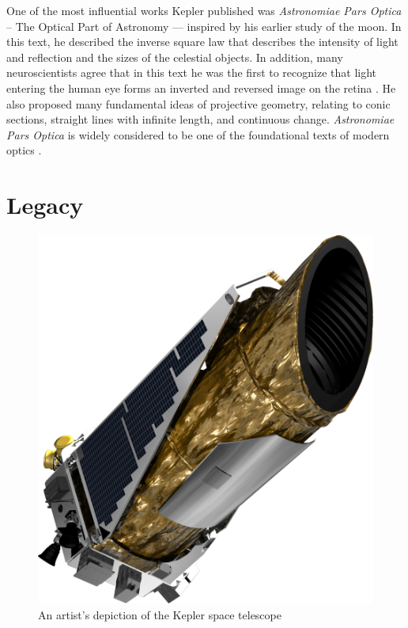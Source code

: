 \documentclass[11pt]{article}
\begin{document}
One of the most influential works
Kepler published was \textit{Astronomiae Pars Optica}
-- The Optical Part of Astronomy ---
inspired by his earlier study of the moon.
In this text,
he described the inverse square law
that describes the intensity of light and reflection
and the sizes of the celestial objects.
In addition,
many neuroscientists agree that
in this text
he was the first to recognize
that light entering the human eye 
forms an inverted and reversed image on the retina \cite{finger}.
He also proposed many
fundamental ideas of projective geometry,
relating to conic sections,
straight lines with infinite length,
and continuous change.
\textit{Astronomiae Pars Optica} is widely considered
to be one of the foundational texts of modern optics \cite{caspar}.




\section{Legacy}

\begin{figure}
\centering
	\includegraphics[scale=0.7]{kepler_telescope.png}
	\caption{An artist's depiction of the Kepler space telescope \cite{telpic}}
\label{kepler_telescope}
\end{figure}
\end{document}
